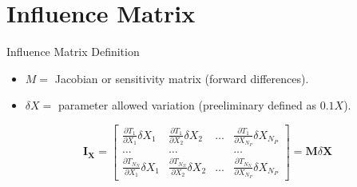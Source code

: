 \documentclass{cubeamer}
\begin{document}
\section{Influence Matrix}
\begin{frame}{ Influence Matrix Definition}
\begin{itemize}
    \item $M = $ Jacobian or sensitivity matrix (forward differences).
    \item $\delta X = $ parameter allowed variation (preeliminary defined as $0.1X$).
\end{itemize}
\begin{center}
\begin{equation}
\mathbf{I}_{\mathbf{X}}=\left[\begin{array}{cccc}
\frac{\partial T_1}{\partial X_1} \delta X_1 & \frac{\partial T_1}{\partial X_2} \delta X_2 & \ldots & \frac{\partial T_1}{\partial X_{N_P}} \delta X_{N_P} \\
\ldots & \ldots & & \ldots \\
\frac{\partial T_{N_N}}{\partial X_1} \delta X_1 & \frac{\partial T_{N_N}}{\partial X_2} \delta X_2 & \ldots & \frac{\partial T_{N_N}}{\partial X_{N_P}} \delta X_{N_P}
\end{array}\right]=\mathbf{M} \delta \boldsymbol{X}
\end{equation}

\end{center}

\end{frame}
\end{document}
